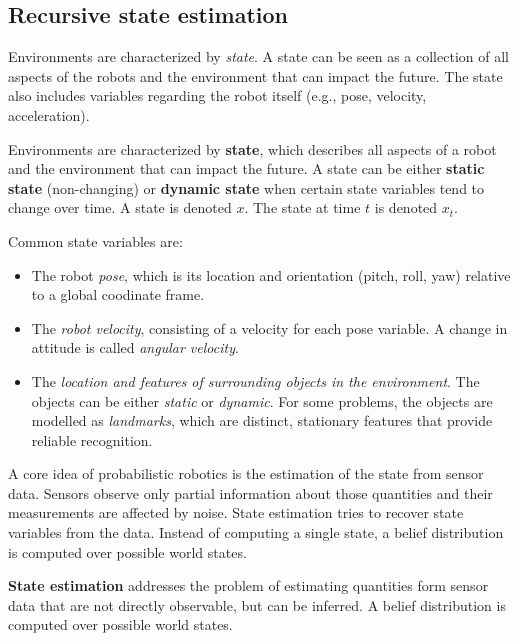 \subsection{Recursive state estimation}
Environments are characterized by \textit{state}.
A state can be seen as a collection of all aspects of the robots and the environment that can impact the future.
The state also includes variables regarding the robot itself (e.g., pose, velocity, acceleration).
\begin{mydef}
Environments are characterized by \textbf{state}, which describes all aspects of a robot and the environment that can impact the future.
A state can be either \textbf{static state} (non-changing) or \textbf{dynamic state} when certain state variables tend to change over time.
A state is denoted $x$.
The state at time $t$ is denoted $x_t$.
\end{mydef}
Common state variables are:
\begin{itemize}
\item The robot \textit{pose}, which is its location and orientation (pitch, roll, yaw) relative to a global coodinate frame.
\item The \textit{robot velocity}, consisting of a velocity for each pose variable. A change in attitude is called \textit{angular velocity}.
\item The \textit{location and features of surrounding objects in the environment}. The objects can be either \textit{static} or \textit{dynamic}. For some problems, the objects are modelled as \textit{landmarks}, which are distinct, stationary features that provide reliable recognition.
\end{itemize}

A core idea of probabilistic robotics is the estimation of the state from sensor data.
Sensors observe only partial information about those quantities and their measurements are affected by noise. 
State estimation tries to recover state variables from the data.
Instead of computing a single state, a belief distribution is computed over possible world states.
\begin{mydef}
\textbf{State estimation} addresses the problem of estimating quantities form sensor data that are not directly observable, but can be inferred.
A belief distribution is computed over possible world states.
\end{mydef}

